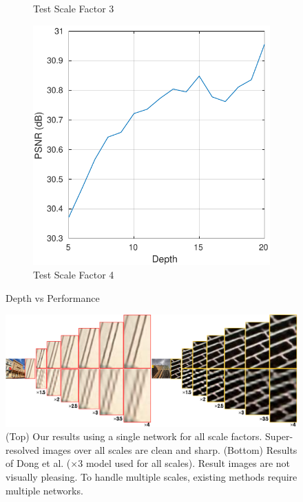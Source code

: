 \documentclass[10pt,twocolumn,letterpaper]{article}
\begin{document}
\begin{figure}[t]
\begin{subfigure}{0.25\textwidth}
		\caption{Test Scale Factor 3}
		\label{fig:tiger}
	\end{subfigure}
	\quad
	\begin{subfigure}{0.25\textwidth}
		\includegraphics[width=\textwidth]{figs/depth_exp3}
		\caption{Test Scale Factor 4}
		\label{fig:mouse}
	\end{subfigure}
	\caption{Depth vs Performance}\label{fig:depth}
\end{figure}


\begin{figure}
\includegraphics[width=\textwidth]{figs/fig1_sffsr.pdf}
\caption{(Top) Our results using a single network for all scale factors. Super-resolved images over all scales are clean and sharp. (Bottom)  Results of Dong et al.  \cite{Dong2014} ($\times$3 model used for all scales). Result images are not visually pleasing. To handle multiple scales, existing methods require multiple networks.}
\end{figure}
\end{document}
